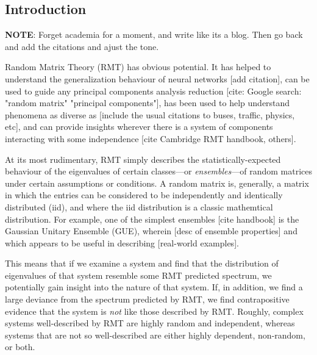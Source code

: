 \documentclass[12pt]{spieman}  %
\begin{document}
\begin{spacing}{2}   %

\section{Introduction}
\label{sect:intro}  %

\textbf{NOTE}: Forget academia for a moment, and write like its a blog. Then go back and add
the citations and ajust the tone.

Random Matrix Theory (RMT) has obvious potential. It has helped to understand the generalization
behaviour of neural networks [add citation], can be used to guide any principal components analysis
reduction [cite: Google search: "random matrix" "principal components"], has been used to help
understand phenomena as diverse as [include the usual citations to buses, traffic, physics, etc],
and can provide insights wherever there is a system of components interacting with some
independence [cite Cambridge RMT handbook, others].

At its most rudimentary, RMT simply describes the statistically-expected behaviour of the
eigenvalues of certain classes—or \textit{ensembles}—of random matrices under certain assumptions or
conditions. A random matrix is, generally, a matrix in which the entries can be considered to be
independently and identically distributed (iid), and where the iid distribution is a classic
mathemtical distribution. For example, one of the simplest ensembles [cite handbook] is the Gaussian
Unitary Ensemble (GUE), wherein [desc of ensemble properties] and which appears to be useful in
describing [real-world examples].

This means that if we examine a system and find that the distribution of eigenvalues of that system
resemble some RMT predicted spectrum, we potentially gain insight into the nature of that system.
If, in addition, we find a large deviance from the spectrum predicted by RMT, we find contrapositive
evidence that the system is \textit{not} like those described by RMT. Roughly, complex systems
well-described by RMT are highly random and independent, whereas systems that are not so
well-described are either highly dependent, non-random, or both.


\end{spacing}
\end{document}
